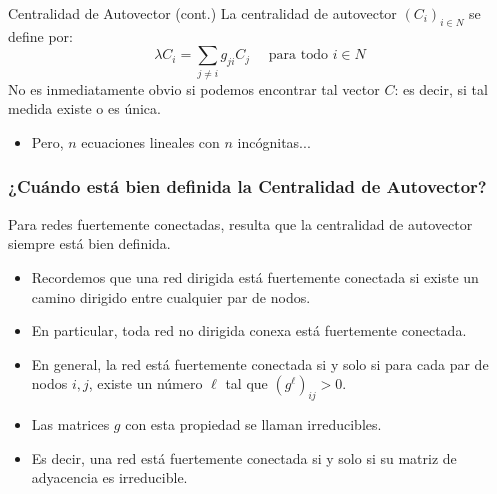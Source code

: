 \documentclass[11pt]{beamer}
\begin{document}
\begin{frame}{Centralidad de Autovector (cont.)}
    La centralidad de autovector $\left(C_{i}\right)_{i \in N}$ se define por:
$$
\lambda C_{i}=\sum_{j \neq i} g_{j i} C_{j} \quad \text { para todo } i \in N
$$
No es inmediatamente obvio si podemos encontrar tal vector $C$: es decir, si tal medida existe o es única.
\begin{itemize}
\item Pero, $n$ ecuaciones lineales con $n$ incógnitas...
\end{itemize}
\end{frame}
    
\begin{frame}[allowframebreaks]
\frametitle{¿Cuándo está bien definida la Centralidad de Autovector?}
Para redes fuertemente conectadas, resulta que la centralidad de autovector siempre está bien definida.
\begin{itemize}
\item Recordemos que una red dirigida está fuertemente conectada si existe un camino dirigido entre cualquier par de nodos.
\item En particular, toda red no dirigida conexa está fuertemente conectada.
\item En general, la red está fuertemente conectada si y solo si para cada par de nodos $i, j$, existe un número $\ell$ tal que $\left(g^{\ell}\right)_{i j}>0$.
\item Las matrices $g$ con esta propiedad se llaman irreducibles.
\item Es decir, una red está fuertemente conectada si y solo si su matriz de adyacencia es irreducible.
\end{itemize}
\end{frame}
\end{document}
